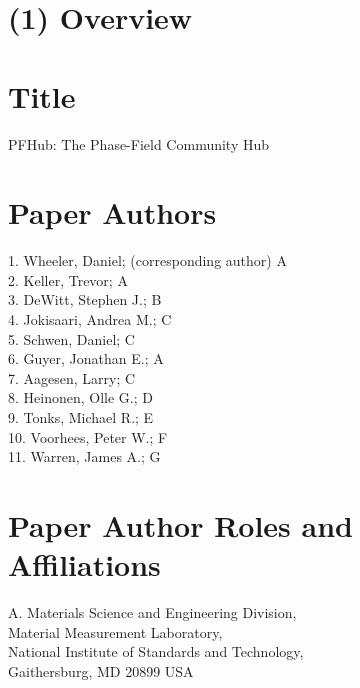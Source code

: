 \documentclass{jors}
\begin{document}
\newcommand\githublink[1]{\href{https://github.com/#1/}{\texttt{\textbf{@#1}}}}




\section*{(1) Overview}

\vspace{0.5cm}

\section*{Title}
\par\bigskip
PFHub: The Phase-Field Community Hub\\[\baselineskip]

\section*{Paper Authors}

1. Wheeler, Daniel; (corresponding author) A\\
2. Keller, Trevor; A\\
3. DeWitt, Stephen J.; B\\
4. Jokisaari, Andrea M.; C\\
5. Schwen, Daniel; C\\
6. Guyer, Jonathan E.; A\\
7. Aagesen, Larry; C\\
8. Heinonen, Olle G.; D\\
9. Tonks, Michael R.; E\\
10. Voorhees, Peter W.; F\\
11. Warren, James A.; G

\section*{Paper Author Roles and Affiliations}

A. Materials Science and Engineering Division, \\
Material Measurement Laboratory, \\
National Institute of Standards and Technology,\\
Gaithersburg, MD 20899 USA
\end{document}
